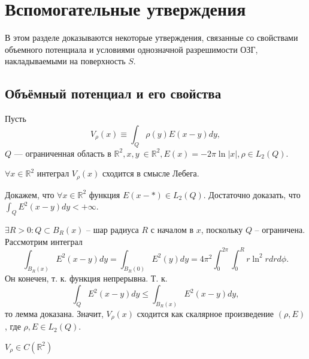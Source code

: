 \documentclass[a4paper, 12pt]{article}
\newcommand{\R}[1]{\mathbb{R}^#1}
\begin{document}
\section{Вспомогательные утверждения}
В этом разделе доказываются некоторые утверждения, связанные со свойствами объемного потенциала и условиями однозначной разрешимости ОЗГ, накладываемыми на поверхность $S$.
\subsection{Объёмный потенциал и его свойства}

Пусть
$$V_{\rho}(x) \equiv \int_Q \rho(y) E(x-y) dy,$$
$Q$ --- ограниченная область в $\R{2}, x,y \ \in \R{2}, E(x)= -2 \pi \ln|x|, \rho \in L_2(Q)$.

\begin{Lem}
  $\forall x \in \R{2}$ интеграл $V_{\rho}(x)$ сходится в смысле Лебега.
\end{Lem}
\begin{Proof}
  Докажем, что $\forall x \in \R{2}$ функция $E(x-*) \in L_2(Q)$. Достаточно доказать, что $\int_Q E^2 (x-y) dy < +\infty$.
  
  $\exists R>0: Q \subset B_R(x)$ -- шар радиуса $R$ с началом в $x$, поскольку $Q$ -- ограничена.
Рассмотрим интеграл 
$$\int_{B_R(x)} E^2(x-y) dy=\int_{B_R(0)}E^2(y)dy=4\pi^2 \int^{2 \pi}_0 \int^R_0 r\ln^2 r dr d\phi.$$
Он конечен, т. к. функция непрерывна. Т. к.
$$\int_Q E^2(x-y)dy \leq \int_{B_R(x)}E^2(x-y)dy,$$
то лемма доказана. Значит, $V_{\rho}(x)$ сходится как скалярное произведение $(\rho, E)$, где $\rho, E \in L_2(Q)$.

\end{Proof}

\begin{Lem}
  $V_{\rho} \in C(\R{2})$
\end{Lem}
\end{document}
